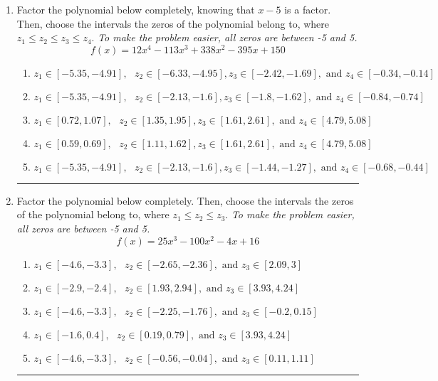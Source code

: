 \documentclass[14pt]{extbook}
\newcommand{\litem}[1]{\item#1\hspace*{-1cm}\rule{\textwidth}{0.4pt}}
\begin{document}
\begin{enumerate}
{\begin{enumerate}[label=\Alph*.]
\end{enumerate} }
\litem{
Factor the polynomial below completely, knowing that $x -5$ is a factor. Then, choose the intervals the zeros of the polynomial belong to, where $z_1 \leq z_2 \leq z_3 \leq z_4$. \textit{To make the problem easier, all zeros are between -5 and 5.}\[ f(x) = 12x^{4} -113 x^{3} +338 x^{2} -395 x + 150 \]\begin{enumerate}[label=\Alph*.]
\item \( z_1 \in [-5.35, -4.91], \text{   }  z_2 \in [-6.33, -4.95], z_3 \in [-2.42, -1.69], \text{   and   } z_4 \in [-0.34, -0.14] \)
\item \( z_1 \in [-5.35, -4.91], \text{   }  z_2 \in [-2.13, -1.6], z_3 \in [-1.8, -1.62], \text{   and   } z_4 \in [-0.84, -0.74] \)
\item \( z_1 \in [0.72, 1.07], \text{   }  z_2 \in [1.35, 1.95], z_3 \in [1.61, 2.61], \text{   and   } z_4 \in [4.79, 5.08] \)
\item \( z_1 \in [0.59, 0.69], \text{   }  z_2 \in [1.11, 1.62], z_3 \in [1.61, 2.61], \text{   and   } z_4 \in [4.79, 5.08] \)
\item \( z_1 \in [-5.35, -4.91], \text{   }  z_2 \in [-2.13, -1.6], z_3 \in [-1.44, -1.27], \text{   and   } z_4 \in [-0.68, -0.44] \)

\end{enumerate} }
\litem{
Factor the polynomial below completely. Then, choose the intervals the zeros of the polynomial belong to, where $z_1 \leq z_2 \leq z_3$. \textit{To make the problem easier, all zeros are between -5 and 5.}\[ f(x) = 25x^{3} -100 x^{2} -4 x + 16 \]\begin{enumerate}[label=\Alph*.]
\item \( z_1 \in [-4.6, -3.3], \text{   }  z_2 \in [-2.65, -2.36], \text{   and   } z_3 \in [2.09, 3] \)
\item \( z_1 \in [-2.9, -2.4], \text{   }  z_2 \in [1.93, 2.94], \text{   and   } z_3 \in [3.93, 4.24] \)
\item \( z_1 \in [-4.6, -3.3], \text{   }  z_2 \in [-2.25, -1.76], \text{   and   } z_3 \in [-0.2, 0.15] \)
\item \( z_1 \in [-1.6, 0.4], \text{   }  z_2 \in [0.19, 0.79], \text{   and   } z_3 \in [3.93, 4.24] \)
\item \( z_1 \in [-4.6, -3.3], \text{   }  z_2 \in [-0.56, -0.04], \text{   and   } z_3 \in [0.11, 1.11] \)


\end{enumerate}}
\end{enumerate}
\end{document}
